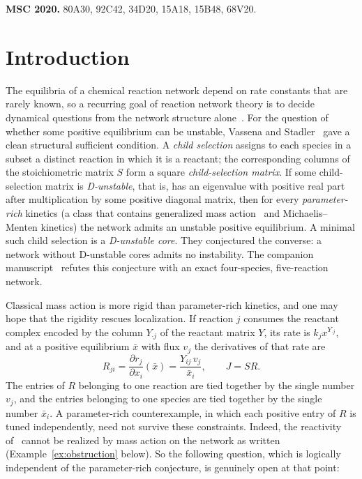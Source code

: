 \documentclass[11pt,a4paper]{article}
\theoremstyle{plain}
\theoremstyle{definition}
\theoremstyle{remark}
\newcommand{\xbar}{\bar{x}}
\begin{document}
\medskip
\noindent\textbf{MSC 2020.} 80A30, 92C42, 34D20, 15A18, 15B48, 68V20.

\section{Introduction}\label{sec:intro}

The equilibria of a chemical reaction network depend on rate constants that are rarely known, so a recurring goal of reaction network theory is to decide dynamical questions from the network structure alone~\cite{Feinberg2019,Clarke1980}. For the question of whether some positive equilibrium can be unstable, Vassena and Stadler~\cite{VassenaStadler2024} gave a clean structural sufficient condition. A \emph{child selection} assigns to each species in a subset a distinct reaction in which it is a reactant; the corresponding columns of the stoichiometric matrix $S$ form a square \emph{child-selection matrix}. If some child-selection matrix is \emph{D-unstable}, that is, has an eigenvalue with positive real part after multiplication by some positive diagonal matrix, then for every \emph{parameter-rich} kinetics (a class that contains generalized mass action~\cite{HornJackson1972,MullerRegensburger2012} and Michaelis--Menten kinetics) the network admits an unstable positive equilibrium. A minimal such child selection is a \emph{D-unstable core}. They conjectured the converse: a network without D-unstable cores admits no instability. The companion manuscript~\cite{Companion2026} refutes this conjecture with an exact four-species, five-reaction network.

Classical mass action is more rigid than parameter-rich kinetics, and one may hope that the rigidity rescues localization. If reaction $j$ consumes the reactant complex encoded by the column $Y_{\cdot j}$ of the reactant matrix $Y$, its rate is $k_j x^{Y_{\cdot j}}$, and at a positive equilibrium $\xbar$ with flux $v_j$ the derivatives of that rate are
\begin{equation}\label{eq:reactivity-intro}
  R_{ji}=\frac{\partial r_j}{\partial x_i}(\xbar)=\frac{Y_{ij}\,v_j}{\xbar_i},\qquad J=SR .
\end{equation}
The entries of $R$ belonging to one reaction are tied together by the single number $v_j$, and the entries belonging to one species are tied together by the single number $\xbar_i$. A parameter-rich counterexample, in which each positive entry of $R$ is tuned independently, need not survive these constraints. Indeed, the reactivity of~\cite{Companion2026} cannot be realized by mass action on the network as written (Example~\ref{ex:obstruction} below). So the following question, which is logically independent of the parameter-rich conjecture, is genuinely open at that point:
\end{document}
